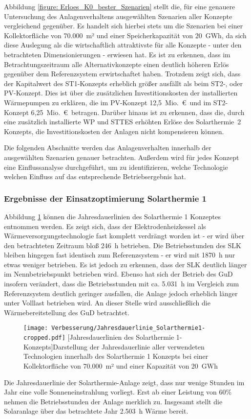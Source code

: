 Abbildung \ref{figure: Erloes_K0_bester_Szenarien} stellt die, für eine genauere Untersuchung des Anlagenverhaltens ausgewählten Szenarien aller Konzepte vergleichend gegenüber. Es handelt sich hierbei stets um die Szenarien bei einer Kollektorfläche von 70.000~m² und einer Speicherkapazität von 20~GWh, da sich diese Auslegung als die wirtschaftlich attraktivste für alle Konzepte - unter den betrachteten Dimensionierungen - erwiesen hat. Es ist zu erkennen, dass im Betrachtungszeitraum alle Alternativkonzepte einen deutlich höheren Erlös gegenüber dem Referenzsystem erwirtschaftet haben. Trotzdem zeigt sich, dass der Kapitalwert des ST1-Konzepts erheblich größer ausfällt als beim ST2-, oder PV-Konzept. Dies ist über die zusätzlichen Investitionskosten der installierten Wärmepumpen zu erklären, die im PV-Konzept 12,5~Mio.~\euro\ und im ST2-Konzept 6,25~Mio.~\euro\ betragen. Darüber hinaus ist zu erkennen, dass die, durch eine zusätzlich installierte \ac{WP} und \ac{STTES} erhöhten Erlöse des Solarthermie~2 Konzepts, die Investitionskosten der Anlagen nicht kompensieren können.

Die folgenden Abschnitte werden das Anlagenverhalten innerhalb der ausgewählten Szenarien genauer betrachten. Außerdem wird für jedes Konzept eine Einflussanalyse durchgeführt, um zu identifizieren, welche Technologie welchen Einfluss auf das entsprechende Betriebsergebnis hat.

\subsubsection{Ergebnisse der Einsatzoptimierung Solarthermie 1}
Abbildung \ref{figure: Jahresdauerlinie_Solarthermie1} können die Jahresdauerlinien des Solarthermie 1 Konzeptes entnommen werden. Es zeigt sich, dass der Elektrodenheizkessel als Wärmeversorgungstechnologie fast komplett verdrängt worden ist - er wird über den betrachteten Zeitraum bloß 246~h betrieben. Die Betriebsstunden des \acl{SLK} bleiben hingegen fast identisch zum Referenzsystem - er wird mit 1870~h nur etwas weniger betrieben. Es ist jedoch zu erkennen, dass der \ac{SLK} deutlich länger im Nennbetriebspunkt betrieben wird. Ebenso hat sich der Betrieb des \ac{GuD} insofern verändert, dass die Betriebsstunden mit ca. 5.031~h im Vergleich zum Referenzsystem deutlich geringer ausfallen, die Anlage  jedoch erheblich länger unter Volllast betrieben wird. An dieser Stelle wird ausschließlich die Wärmebereitstellung des \ac{GuD} betrachtet.
	\begin{figure}[ht]
		\centering
		\texttt{[image: Verbesserung/Jahresdauerlinie\_Solarthermie1-cropped.pdf]}
		[Jahresdauerlinien des Solarthermie 1-Konzepts]{Darstellung der Jahresdauerlinie aller verwendeten Technologien innerhalb des Solarthermie 1 Konzepts bei einer Kollektorfläche von 70.000~m² und einer Kapazität von 20~GWh}
		\label{figure: Jahresdauerlinie_Solarthermie1}
	\end{figure}
Die Jahresdauerlinie der Solarthermie-Anlage zeigt, dass nur wenige Stunden im Jahr eine volle Sonneneinstrahlung vorliegt. Erst ab einer Leistung von 60\% nehmen die Betriebsstunden der Anlage merklich zu. Insgesamt stellt die Solaranlage über das betrachtete Jahr 2.503~h Wärme bereit. 

